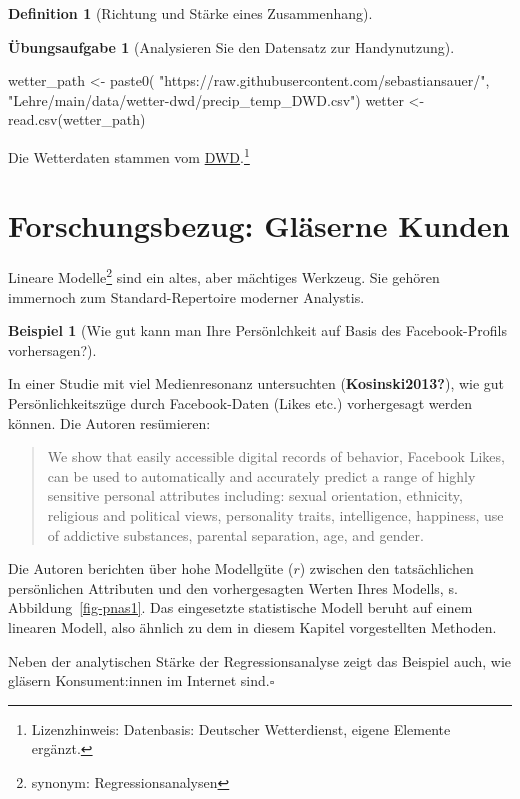 \documentclass[
  a4paper,
  DIV=11]{scrreprt}
\newenvironment{Shaded}{\begin{snugshade}}{\end{snugshade}}
\newcommand{\FunctionTok}[1]{\textcolor[rgb]{0.28,0.35,0.67}{#1}}
\newcommand{\NormalTok}[1]{\textcolor[rgb]{0.00,0.23,0.31}{#1}}
\newcommand{\OtherTok}[1]{\textcolor[rgb]{0.00,0.23,0.31}{#1}}
\newcommand{\StringTok}[1]{\textcolor[rgb]{0.13,0.47,0.30}{#1}}
\theoremstyle{definition}
\newtheorem{exercise}{Übungsaufgabe}[chapter]
\theoremstyle{definition}
\newtheorem{example}{Beispiel}[chapter]
\theoremstyle{definition}
\newtheorem{definition}{Definition}[chapter]
\theoremstyle{remark}
\begin{document}
\begin{definition}[Richtung und Stärke eines
Zusammenhang]
\begin{exercise}[Analysieren Sie den Datensatz zur
Handynutzung]
\begin{Shaded}
\begin{Highlighting}[]
\NormalTok{wetter\_path }\OtherTok{\textless{}{-}} \FunctionTok{paste0}\NormalTok{( }\StringTok{"https://raw.githubusercontent.com/sebastiansauer/"}\NormalTok{,}
\StringTok{"Lehre/main/data/wetter{-}dwd/precip\_temp\_DWD.csv"}\NormalTok{)}
\NormalTok{wetter }\OtherTok{\textless{}{-}} \FunctionTok{read.csv}\NormalTok{(wetter\_path)}
\end{Highlighting}
\end{Shaded}

Die Wetterdaten stammen vom
\href{https://opendata.dwd.de/}{DWD}.\footnote{Lizenzhinweis:
  Datenbasis: Deutscher Wetterdienst, eigene Elemente ergänzt.}

\section{Forschungsbezug: Gläserne
Kunden}\label{forschungsbezug-gluxe4serne-kunden}

Lineare Modelle\footnote{synonym: Regressionsanalysen} sind ein altes,
aber mächtiges Werkzeug. Sie gehören immernoch zum Standard-Repertoire
moderner Analystis.

\begin{example}[Wie gut kann man Ihre Persönlchkeit auf Basis des
Facebook-Profils
vorhersagen?]\protect\hypertarget{exm-kosinski}{}\label{exm-kosinski}

In einer Studie mit viel Medienresonanz untersuchten
(\textbf{Kosinski2013?}), wie gut Persönlichkeitszüge durch
Facebook-Daten (Likes etc.) vorhergesagt werden können. Die Autoren
resümieren:

\begin{quote}
We show that easily accessible digital records of behavior, Facebook
Likes, can be used to automatically and accurately predict a range of
highly sensitive personal attributes including: sexual orientation,
ethnicity, religious and political views, personality traits,
intelligence, happiness, use of addictive substances, parental
separation, age, and gender.
\end{quote}

Die Autoren berichten über hohe Modellgüte (\(r\)) zwischen den
tatsächlichen persönlichen Attributen und den vorhergesagten Werten
Ihres Modells, s. Abbildung~\ref{fig-pnas1}. Das eingesetzte
statistische Modell beruht auf einem linearen Modell, also ähnlich zu
dem in diesem Kapitel vorgestellten Methoden.

Neben der analytischen Stärke der Regressionsanalyse zeigt das Beispiel
auch, wie gläsern Konsument:innen im Internet sind.\(\square\)


\end{example}
\end{exercise}
\end{definition}
\end{document}
